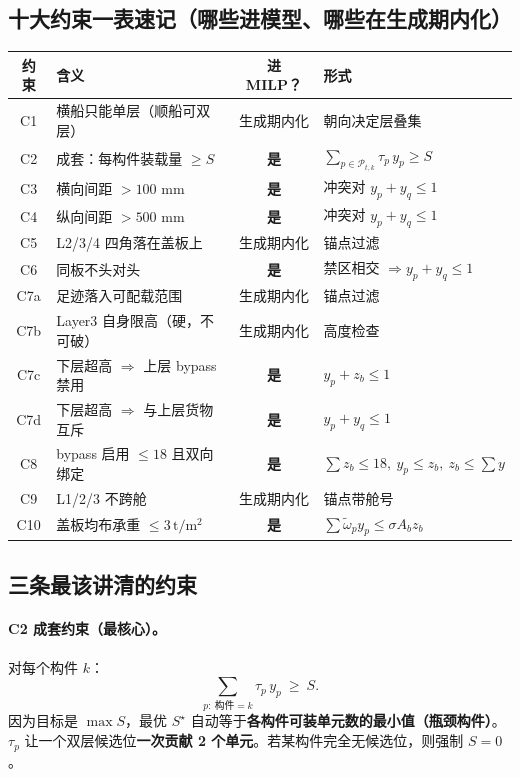 \documentclass[11pt]{ctexart}
\newcommand{\unit}[1]{\,\mathrm{#1}}
\newcommand{\setP}{\mathcal{P}}
\begin{document}
\subsection{十大约束一表速记（哪些进模型、哪些在生成期内化）}
\begin{center}\small
\begin{tabular}{clcl}
\toprule
约束 & 含义 & 进 MILP？ & 形式 \\
\midrule
C1 & 横船只能单层（顺船可双层） & 生成期内化 & 朝向决定层叠集 \\
C2 & 成套：每构件装载量 $\ge S$ & \textbf{是} & $\sum_{p\in\setP_{t,k}}\tau_p\,y_p\ge S$ \\
C3 & 横向间距 $>100$ mm & \textbf{是} & 冲突对 $y_{p}+y_{q}\le1$ \\
C4 & 纵向间距 $>500$ mm & \textbf{是} & 冲突对 $y_{p}+y_{q}\le1$ \\
C5 & L2/3/4 四角落在盖板上 & 生成期内化 & 锚点过滤 \\
C6 & 同板不头对头 & \textbf{是} & 禁区相交 $\Rightarrow y_{p}+y_{q}\le1$ \\
C7a & 足迹落入可配载范围 & 生成期内化 & 锚点过滤 \\
C7b & Layer3 自身限高（硬，不可破） & 生成期内化 & 高度检查 \\
C7c & 下层超高 $\Rightarrow$ 上层 bypass 禁用 & \textbf{是} & $y_p+z_b\le1$ \\
C7d & 下层超高 $\Rightarrow$ 与上层货物互斥 & \textbf{是} & $y_p+y_q\le1$ \\
C8 & bypass 启用 $\le18$ 且双向绑定 & \textbf{是} & $\sum z_b\le18,\ y_p\le z_b,\ z_b\le\sum y$ \\
C9 & L1/2/3 不跨舱 & 生成期内化 & 锚点带舱号 \\
C10 & 盖板均布承重 $\le 3\unit{t/m^2}$ & \textbf{是} & $\sum\tilde\omega_p y_p\le\sigma A_b z_b$ \\
\bottomrule
\end{tabular}
\end{center}

\subsection{三条最该讲清的约束}

\paragraph{C2 成套约束（最核心）。}对每个构件 $k$：
\[
\sum_{p:\ \text{构件}=k}\tau_p\,y_p\ \ge\ S.
\]
因为目标是 $\max S$，最优 $S^\star$ 自动等于\textbf{各构件可装单元数的最小值（瓶颈构件）}。
$\tau_p$ 让一个双层候选位\textbf{一次贡献 2 个单元}。若某构件完全无候选位，则强制 $S=0$。
\end{document}

